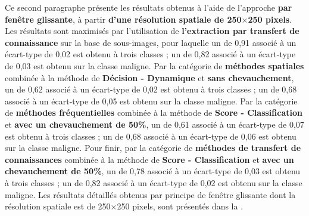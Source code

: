 Ce second paragraphe présente les résultats obtenus à l'aide de l'approche \textbf{par fenêtre glissante}, à partir \textbf{d'une résolution spatiale de 250$\times$250 pixels}. Les résultats sont maximisés par l'utilisation de \textbf{l'extraction par transfert de connaissance} sur la base de sous-images, pour laquelle un \fscore{} de 0,91 associé à un écart-type de 0,02 est obtenu à trois classes ; un \fscore{} de 0,82 associé à un écart-type de 0,03 est obtenu sur la classe maligne. Par la catégorie de \textbf{méthodes spatiales} combinée à la méthode de \textbf{Décision - Dynamique} et \textbf{sans chevauchement}, un \fscore{} de 0,62 associé à un écart-type de 0,02 est obtenu à trois classes ; un \fscore{} de 0,68 associé à un écart-type de 0,05 est obtenu sur la classe maligne. Par la catégorie de \textbf{méthodes fréquentielles} combinée à la méthode de \textbf{Score - Classification} et \textbf{avec un chevauchement de 50\%}, un \fscore{} de 0,61 associé à un écart-type de 0,07 est obtenu à trois classes ; un \fscore{} de 0,68 associé à un écart-type de 0,06 est obtenu sur la classe maligne. Pour finir, par la catégorie de \textbf{méthodes de transfert de connaissances} combinée à la méthode de \textbf{Score - Classification} et \textbf{avec un chevauchement de 50\%}, un \fscore{} de 0,78 associé à un écart-type de 0,03 est obtenu à trois classes ; un \fscore{} de 0,82 associé à un écart-type de 0,02 est obtenu sur la classe maligne. Les résultats détaillés obtenus par principe de fenêtre glissante dont la résolution spatiale est de 250$\times$250 pixels, sont présentés dans la .\par

